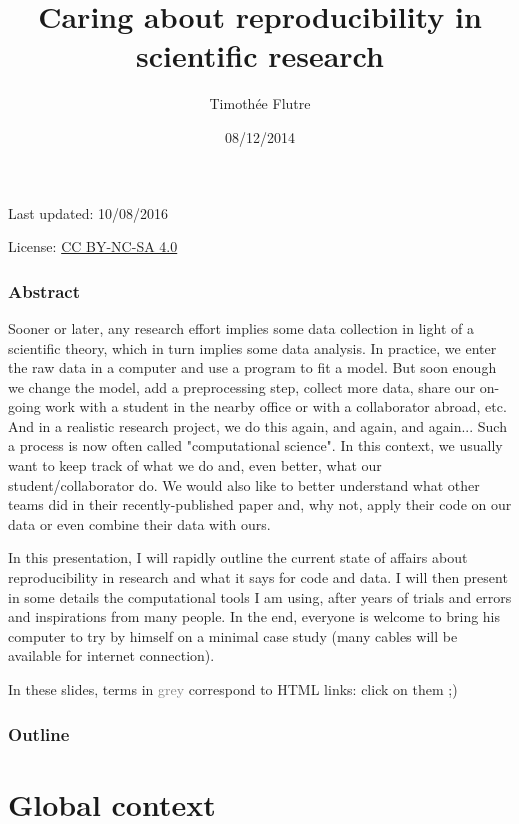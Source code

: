 \documentclass[c]{beamer} %
\title[Reproducible research]{Caring about reproducibility in scientific research}
\author[T. Flutre]{Timoth\'{e}e Flutre}
\institute[INRA]{INRA, UMR AGAP}
\date{08/12/2014}
\begin{document}
\begin{frame}
  \titlepage
  
  \tiny
  \begin{center}
    Last updated: 10/08/2016
    
    \medskip
    
    License: \href{http://creativecommons.org/licenses/by-nc-sa/4.0/}{CC BY-NC-SA 4.0}
  \end{center}
\end{frame}                                                                                                                       
\begin{frame}
  \frametitle{Abstract}
  \tiny
  Sooner or later, any research effort implies some data collection in light of a scientific theory, which in turn implies some data analysis. In practice, we enter the raw data in a computer and use a program to fit a model. But soon enough we change the model, add a preprocessing step, collect more data, share our on-going work with a student in the nearby office or with a collaborator abroad, etc. And in a realistic research project, we do this again, and again, and again... Such a process is now often called "computational science". In this context, we usually want to keep track of what we do and, even better, what our student/collaborator do. We would also like to better understand what other teams did in their recently-published paper and, why not, apply their code on our data or even combine their data with ours.
  
  \medskip
  
  In this presentation, I will rapidly outline the current state of affairs about reproducibility in research and what it says for code and data. I will then present in some details the computational tools I am using, after years of trials and errors and inspirations from many people. In the end, everyone is welcome to bring his computer to try by himself on a minimal case study (many cables will be available for internet connection).
  
  \bigskip
  
  In these slides, terms in \textcolor{gray}{grey} correspond to HTML links: click on them ;)
\end{frame}

\begin{frame}
  \frametitle{Outline}
  \tableofcontents
\end{frame}

\section{Global context}
\end{document}

